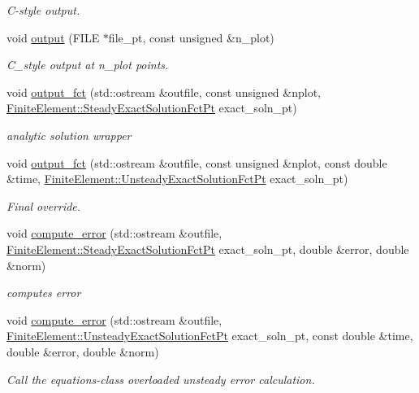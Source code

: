 \begin{DoxyCompactItemize}
\begin{DoxyCompactList}\small\item\em C-\/style output. \end{DoxyCompactList}\item 
void \hyperlink{classoomph_1_1BiharmonicElement_a6466cb310679bf54811011f086ffb957}{output} (F\+I\+LE $\ast$file\+\_\+pt, const unsigned \&n\+\_\+plot)
\begin{DoxyCompactList}\small\item\em C\+\_\+style output at n\+\_\+plot points. \end{DoxyCompactList}\item 
void \hyperlink{classoomph_1_1BiharmonicElement_a1c2dd136ac2a0f263c6a444a3db5a750}{output\+\_\+fct} (std\+::ostream \&outfile, const unsigned \&nplot, \hyperlink{classoomph_1_1FiniteElement_a690fd33af26cc3e84f39bba6d5a85202}{Finite\+Element\+::\+Steady\+Exact\+Solution\+Fct\+Pt} exact\+\_\+soln\+\_\+pt)
\begin{DoxyCompactList}\small\item\em analytic solution wrapper \end{DoxyCompactList}\item 
void \hyperlink{classoomph_1_1BiharmonicElement_ad8a8d7e9f534480b7acf45716dc62721}{output\+\_\+fct} (std\+::ostream \&outfile, const unsigned \&nplot, const double \&time, \hyperlink{classoomph_1_1FiniteElement_ad4ecf2b61b158a4b4d351a60d23c633e}{Finite\+Element\+::\+Unsteady\+Exact\+Solution\+Fct\+Pt} exact\+\_\+soln\+\_\+pt)
\begin{DoxyCompactList}\small\item\em Final override. \end{DoxyCompactList}\item 
void \hyperlink{classoomph_1_1BiharmonicElement_a456d89dce0ecf60aafab33c035838581}{compute\+\_\+error} (std\+::ostream \&outfile, \hyperlink{classoomph_1_1FiniteElement_a690fd33af26cc3e84f39bba6d5a85202}{Finite\+Element\+::\+Steady\+Exact\+Solution\+Fct\+Pt} exact\+\_\+soln\+\_\+pt, double \&error, double \&norm)
\begin{DoxyCompactList}\small\item\em computes error \end{DoxyCompactList}\item 
void \hyperlink{classoomph_1_1BiharmonicElement_a0b1d07f8300afffeacaabb3aef2841fb}{compute\+\_\+error} (std\+::ostream \&outfile, \hyperlink{classoomph_1_1FiniteElement_ad4ecf2b61b158a4b4d351a60d23c633e}{Finite\+Element\+::\+Unsteady\+Exact\+Solution\+Fct\+Pt} exact\+\_\+soln\+\_\+pt, const double \&time, double \&error, double \&norm)
\begin{DoxyCompactList}\small\item\em Call the equations-\/class overloaded unsteady error calculation. \end{DoxyCompactList}\end{DoxyCompactItemize}
